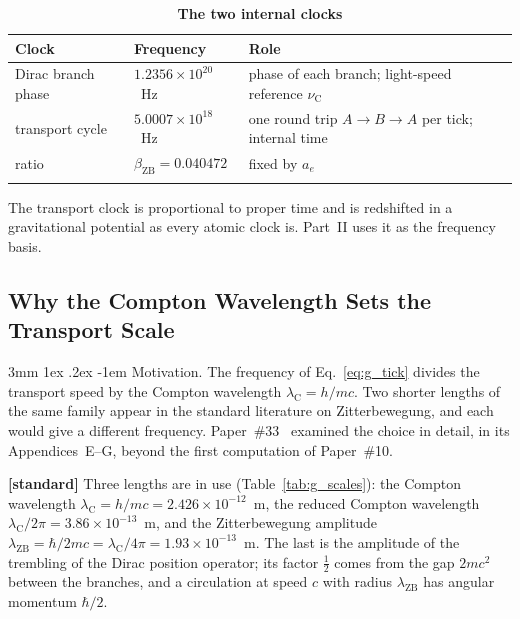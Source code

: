 \documentclass[%
 reprint, amsmath,amssymb, aps, prb, ]{revtex4-2}
\makeatletter
\numberwithin{equation}{section}
\renewcommand\paragraph{%
  \@startsection{paragraph}{4}{\z@}%
    {3mm \@plus 1ex \@minus .2ex}%
    {-1em}%
    {\normalfont\normalsize\itshape}}
\newcommand{\betaZB}{\beta_{\text{ZB}}}
\newcommand{\lambdaC}{\lambda_{\text{C}}}
\newcommand{\nuC}{\nu_{\text{C}}}
\makeatother
\begin{document}
\begin{table}[t!]
\centering
\caption{\textbf{The two internal clocks}}
\label{tab:g_clocks}
\renewcommand{\arraystretch}{1.4}
\begin{tabular}{>{\raggedright\arraybackslash}p{1.7cm}>{\raggedright\arraybackslash}p{2.5cm}>{\raggedright\arraybackslash}p{2.6cm}}
\toprule
\textbf{Clock} & \textbf{Frequency} & \textbf{Role} \\
\midrule
Dirac branch phase & $1.2356\times10^{20}$~Hz & phase of each branch; light-speed reference $\nuC$ \\
\addlinespace[0.2cm]
transport cycle & $5.0007\times10^{18}$~Hz & one round trip $A\to B\to A$ per tick; internal time \\
\addlinespace[0.2cm]
ratio & $\betaZB = 0.040472$ & fixed by $a_e$ \\
\addlinespace[0.2cm]
\bottomrule
\end{tabular}
\vspace{0.2cm}
\begin{minipage}{0.95\columnwidth}
\justifying\footnotesize
The transport clock is proportional to proper time and is redshifted in a gravitational potential as every atomic clock is. Part~II uses it as the frequency basis.
\end{minipage}
\end{table}

\subsection{Why the Compton Wavelength Sets the Transport Scale}
\label{subsec:g_scale}

\paragraph{Motivation.} The frequency of Eq.~\eqref{eq:g_tick} divides the transport speed by the Compton wavelength $\lambdaC = h/mc$. Two shorter lengths of the same family appear in the standard literature on Zitterbewegung, and each would give a different frequency. Paper~\#33~\cite{hanamura33} examined the choice in detail, in its Appendices~E--G, beyond the first computation of Paper~\#10.

\textbf{[standard]} Three lengths are in use (Table~\ref{tab:g_scales}): the Compton wavelength $\lambdaC = h/mc = 2.426\times10^{-12}$~m, the reduced Compton wavelength $\lambdaC/2\pi = 3.86\times10^{-13}$~m, and the Zitterbewegung amplitude $\lambda_{\text{ZB}} = \hbar/2mc = \lambdaC/4\pi = 1.93\times10^{-13}$~m. The last is the amplitude of the trembling of the Dirac position operator; its factor $\tfrac12$ comes from the gap $2mc^{2}$ between the branches, and a circulation at speed $c$ with radius $\lambda_{\text{ZB}}$ has angular momentum $\hbar/2$.
\end{document}
